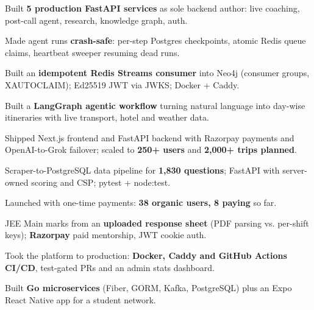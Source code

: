 \documentclass[10pt]{article}
\begin{document}
\begin{rkbody}
\begin{rkitems}
  \item Built \textbf{5 production FastAPI services} as sole backend author: live coaching, post-call agent, research, knowledge graph, auth.
  \item Made agent runs \textbf{crash-safe}: per-step Postgres checkpoints, atomic Redis queue claims, heartbeat sweeper resuming dead runs.
  \item Built an \textbf{idempotent Redis Streams consumer} into Neo4j (consumer groups, XAUTOCLAIM); Ed25519 JWT via JWKS; Docker + Caddy.
\end{rkitems}
\begin{rkitems}
  \item Built a \textbf{LangGraph agentic workflow} turning natural language into day-wise itineraries with live transport, hotel and weather data.
  \item Shipped Next.js frontend and FastAPI backend with Razorpay payments and OpenAI-to-Grok failover; scaled to \textbf{250+ users} and \textbf{2,000+ trips planned}.
\end{rkitems}
\begin{rkitems}
  \item Scraper-to-PostgreSQL data pipeline for \textbf{1,830 questions}; FastAPI with server-owned scoring and CSP; pytest + node:test.
  \item Launched with one-time payments: \textbf{38 organic users, 8 paying} so far.
\end{rkitems}
\begin{rkitems}
  \item JEE Main marks from an \textbf{uploaded response sheet} (PDF parsing vs. per-shift keys); \textbf{Razorpay} paid mentorship, JWT cookie auth.
\end{rkitems}
\begin{rkitems}
  \item Took the platform to production: \textbf{Docker, Caddy and GitHub Actions CI/CD}, test-gated PRs and an admin stats dashboard.
\end{rkitems}
\begin{rkitems}
  \item Built \textbf{Go microservices} (Fiber, GORM, Kafka, PostgreSQL) plus an Expo React Native app for a student network.
\end{rkitems}


\end{rkbody}
\end{document}
